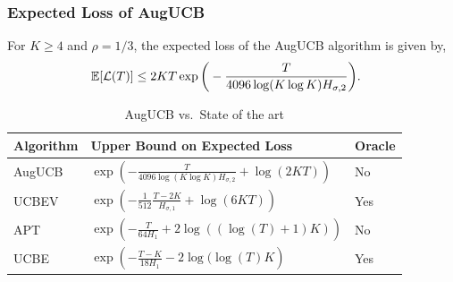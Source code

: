 \begin{frame}
\frametitle{Expected Loss of AugUCB}

\begin{theorem}
For $K\geq 4$ and $\rho={1}/{3}$,
the expected loss of the AugUCB algorithm is given by,
\begin{align*}
\mathbb{E}[\mathcal{L}(T)]
& \leq 2KT \exp\bigg(- \frac{T}{4096 \log( K\log K) H_{\sigma,2}} \bigg).
\end{align*}
\end{theorem}


\begin{table}[b]
\caption{AugUCB vs.\ State of the art}
\label{tab:regret-bds}
\begin{center}
\begin{tabular}{|p{1.5cm}|p{6.4cm}|p{1.5cm}|}
\hline
Algorithm  & Upper Bound on Expected Loss & Oracle \\
\hline
AugUCB      &$ \exp\left(- \frac{T}{4096 \log(K\log K)H_{\sigma,2}} + \log\left(2KT\right) \right) $ & No\\
\hline
UCBEV		&$\exp\left(-\frac{1}{512}\frac{T-2K}{H_{\sigma,1}} + \log\left(6KT\right)\right)$ & Yes\\
\hline
APT         &$\exp\left(-\frac{T}{64 H_1}+2\log((\log(T)+1)K)\right)$ & No\\
\hline
UCBE		&$\exp\left(-\frac{T-K}{18 H_1} - 2\log(\log(T)K\right)$ &  Yes\\
\hline

\end{tabular}
\end{center}
\end{table}
\end{frame}

%
%

